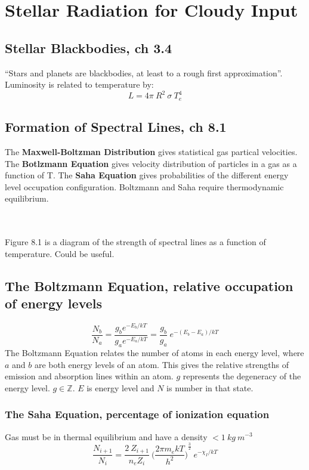 \section{Stellar Radiation for Cloudy Input}
\subsection{Stellar Blackbodies, ch 3.4}
``Stars and planets are blackbodies, at least to a rough first approximation''.
Luminosity is related to temperature by:
\begin{equation}
  L=4\pi~R^2~\sigma~T^{4}_{e}
\end{equation}

\subsection{Formation of Spectral Lines, ch 8.1}
The \textbf{Maxwell-Boltzman Distribution} gives statistical gas partical velocities. The \textbf{Botlzmann Equation} gives velocity distribution of particles in a gas as a function of T. The \textbf{Saha Equation} gives probabilities of the different energy level occupation configuration. Boltzmann and Saha require thermodynamic equilibrium.

\\\\
Figure 8.1 is a diagram of the strength of spectral lines as a function of temperature. Could be useful.

\subsection{The Boltzmann Equation, relative occupation of energy levels}
\begin{equation}
  \frac{N_{b}}{N_{a}}=\frac{g_{b}e^{-E_{b}/kT}}{g_{a}e^{-E_{a}/kT}}=\frac{g_{b}}{g_{a}}\ e^{-(E_{b}-E_{a})/kT}
\end{equation}
The Boltzmann Equation relates the number of atoms in each energy level, where $ a $ and $ b $ are both energy levels of an atom. This gives the relative strengths of emission and absorption lines within an atom. $ g $ represents the degeneracy of the energy level. $ g\in \mathbb{Z} $. $ E $ is energy level and $ N $ is number in that state.

\subsubsection{The Saha Equation, percentage of ionization equation}
Gas must be in thermal equilibrium and have a density $ < 1~kg~m^{-3} $ 
\begin{equation}
  \frac{N_{i+1}}{N_{i}}=\frac{2~Z_{i+1}}{n_{e}Z_{i}}~{\bigg( \frac{2 \pi m_{e}kT}{h^2}\bigg)}^{\frac{3}{2}}~e^{-\chi_{I}/kT}
\end{equation}

